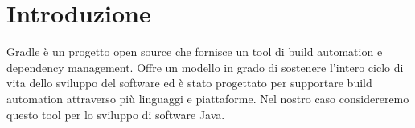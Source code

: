 \section{Introduzione}
Gradle è un progetto open source che fornisce un tool di build automation e dependency management. Offre un modello in grado di sostenere l'intero ciclo di vita dello sviluppo del software ed è stato progettato per supportare build automation attraverso più linguaggi e piattaforme. Nel nostro caso considereremo questo tool per lo sviluppo di software Java.



